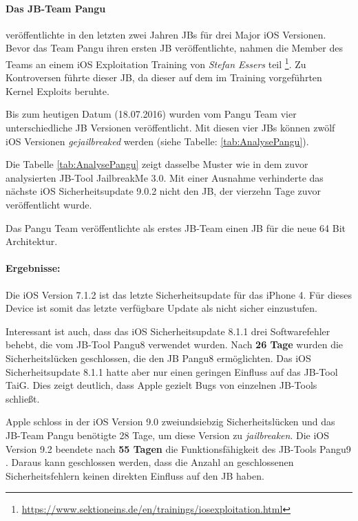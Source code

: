 \paragraph{Das JB-Team Pangu} veröffentlichte in den letzten zwei Jahren JBs für drei Major iOS Versionen. Bevor das Team Pangu ihren ersten JB veröffentlichte, nahmen die Member des Teams an einem iOS Exploitation Training von \textit{\glqq Stefan Essers\grqq{}} teil \footnote{\url{https://www.sektioneins.de/en/trainings/iosexploitation.html}}. Zu Kontroversen führte dieser JB, da dieser auf dem im Training vorgeführten Kernel Exploits beruhte.\par
Bis zum heutigen Datum (18.07.2016) wurden vom Pangu Team vier unterschiedliche JB Versionen veröffentlicht. Mit diesen vier JBs können zwölf iOS Versionen \textit{\glqq gejailbreaked\grqq{}} werden (siehe Tabelle: \ref{tab:AnalysePangu}).

Die Tabelle \ref{tab:AnalysePangu} zeigt dasselbe Muster wie in dem zuvor analysierten JB-Tool JailbreakMe 3.0. Mit einer Ausnahme verhinderte das nächste iOS Sicherheitsupdate 9.0.2 nicht den JB, der vierzehn Tage zuvor veröffentlicht wurde. \par 
Das Pangu Team veröffentlichte als erstes JB-Team einen JB für die neue 64 Bit Architektur. 

\paragraph{Ergebnisse:}  Die iOS Version 7.1.2 ist das letzte Sicherheitsupdate für das iPhone 4. Für dieses Device ist somit das letzte verfügbare Update als nicht sicher einzustufen. \par 
Interessant ist auch, dass das iOS Sicherheitsupdate 8.1.1 drei Softwarefehler behebt, die vom JB-Tool Pangu8 verwendet wurden. Nach \textbf{26 Tage} wurden die Sicherheitslücken geschlossen, die den JB Pangu8 ermöglichten. Das iOS Sicherheitsupdate 8.1.1 hatte aber nur einen geringen Einfluss auf das JB-Tool TaiG. Dies zeigt deutlich, dass Apple gezielt Bugs von einzelnen JB-Tools schließt. 

Apple schloss in der iOS Version 9.0 zweiundsiebzig Sicherheitslücken und das JB-Team Pangu benötigte 28 Tage, um diese Version zu \textit{\glqq jailbreaken\grqq{}}. Die iOS Version 9.2 beendete nach \textbf{55 Tagen} die Funktionsfähigkeit des JB-Tools Pangu9 . Daraus kann geschlossen werden, dass die Anzahl an geschlossenen Sicherheitsfehlern keinen direkten Einfluss auf den JB haben.

